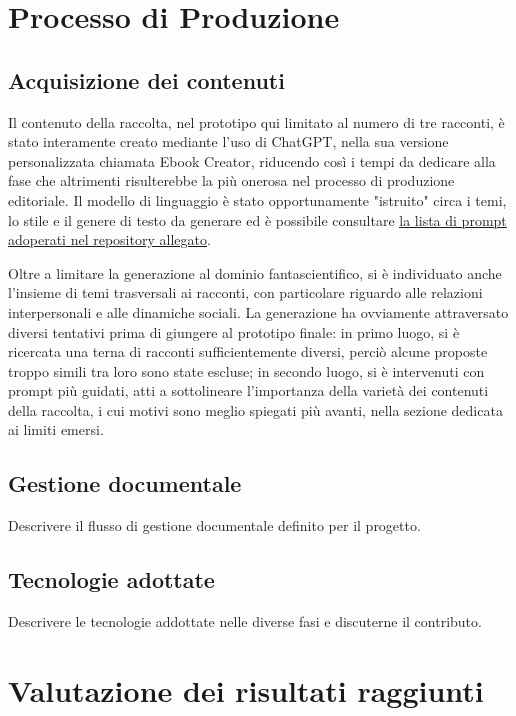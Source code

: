 \documentclass[a4paper,12pt]{article}
\begin{document}
\section*{Processo di Produzione}
\subsection*{Acquisizione dei contenuti}

Il contenuto della raccolta, nel prototipo qui limitato al numero di tre racconti, è stato interamente creato mediante l'uso di ChatGPT, nella sua versione personalizzata chiamata Ebook Creator, riducendo così i tempi da dedicare alla fase che altrimenti risulterebbe la più onerosa nel processo di produzione editoriale. Il modello di linguaggio è stato opportunamente "istruito" circa i temi, lo stile e il genere di testo da generare ed è possibile consultare \href{https://github.com/gianlucapironato/editoria_digitale/blob/main/prompt%20acquisizione%20contenuti.md}{\underline{la lista di prompt adoperati nel repository allegato}}.

\bigbreak

Oltre a limitare la generazione al dominio fantascientifico, si è individuato anche l'insieme di temi trasversali ai racconti, con particolare riguardo alle relazioni interpersonali e alle dinamiche sociali. La generazione ha ovviamente attraversato diversi tentativi prima di giungere al prototipo finale: in primo luogo, si è ricercata una terna di racconti sufficientemente diversi, perciò alcune proposte troppo simili tra loro sono state escluse; in secondo luogo, si è intervenuti con prompt più guidati, atti a sottolineare l'importanza della varietà dei contenuti della raccolta, i cui motivi sono meglio spiegati più avanti, nella sezione dedicata ai limiti emersi.

\subsection*{Gestione documentale}
Descrivere il flusso di gestione documentale definito per il progetto.

\subsection*{Tecnologie adottate}
Descrivere le tecnologie addottate nelle diverse fasi e discuterne il contributo.

\section*{Valutazione dei risultati raggiunti}
\end{document}
